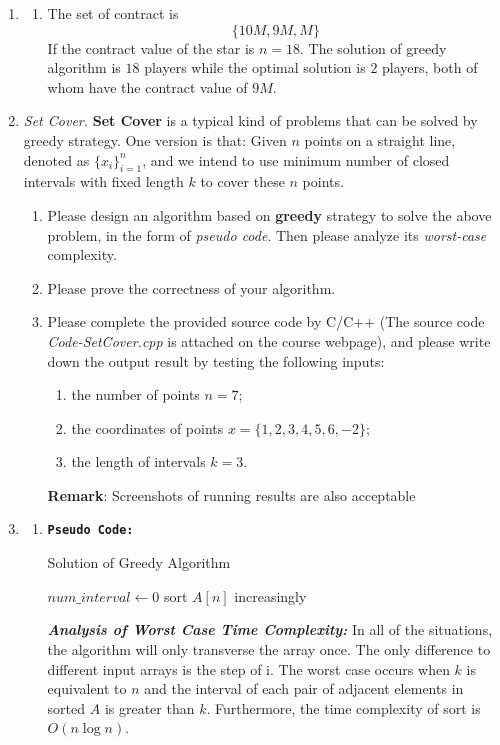\documentclass[12pt,a4paper]{article}
\makeatletter
\newtheorem*{solution}{Solution}
\theoremstyle{definition}
\renewenvironment{solution}[1][Solution] {\par\pushQED{\qed}\normalfont\topsep6\p@\@plus6\p@\relax\trivlist\item[\hskip\labelsep\bfseries#1\@addpunct{.}]\ignorespaces}{\popQED\endtrivlist\@endpefalse} \makeatother
\makeatother
\begin{document}
\begin{enumerate}
\begin{solution}
\begin{enumerate}
	\item
	The set of contract is $$\{10M,9M,M\}$$
	If the contract value of the star is $n=18$. The solution of greedy algorithm is $18$ players while the optimal solution is $2$ players, both of whom have the contract value of $9M$.
    \end{enumerate}
    \end{solution}
	
    \item \textit{Set Cover.} \textbf{Set Cover} is a typical kind of problems that can be solved by greedy strategy. One version is that: Given $n$ points on a straight line, denoted as $\{x_i\}_{i=1}^n$, and we intend to use minimum number of closed intervals with fixed length $k$ to cover these $n$ points.
    \begin{enumerate}
    	\item Please design an algorithm based on \textbf{greedy} strategy to solve the above problem, in the form of \emph{pseudo code}. Then please analyze its \emph{worst-case} complexity.
    	\item Please prove the correctness of your algorithm.
    	\item Please complete the provided source code by C/C++ {\color{blue}(The source code \emph{Code-SetCover.cpp} is attached on the course webpage)}, and please write down the output result by testing the following inputs: 
    	\begin{enumerate}
    		\item the number of points $n=7$;
    		\item the coordinates of points
    		$x=\{1,2,3,4,5,6,-2\}$;
    		\item the length of intervals
    		$k=3$.
    	\end{enumerate}
        \textbf{Remark}: Screenshots of running results are also acceptable 
    \end{enumerate}
    \begin{solution}
    \begin{enumerate}
    \item
    \textbf{\texttt{Pseudo Code:}}\\
    \begin{algorithm}[H]
		
		\BlankLine
		\caption{Solution of Greedy Algorithm}\label{Alg-greedy}
		$num\_interval\leftarrow 0$\;
		sort $A[n]$ increasingly\;
	\end{algorithm}
    \textbf{\textit{Analysis of Worst Case Time Complexity:}}
    In all of the situations, the algorithm will only transverse the array once. The only difference to different input arrays is the step of i. The worst case occurs when $k$ is equivalent to $n$ and the interval of each pair of  adjacent elements in sorted $A$ is greater than $k$. Furthermore, the time complexity of sort is $O(n\log n)$.
    

\end{enumerate}
\end{solution}
\end{enumerate}
\end{document}
